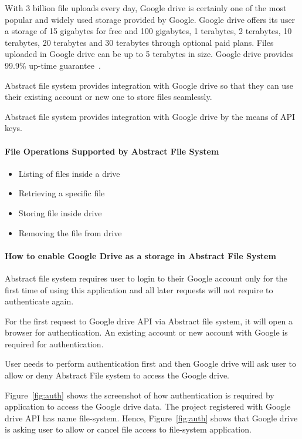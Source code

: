 With 3 billion file uploads every day, Google drive is certainly one of the 
most popular and widely used storage provided by Google. Google drive offers 
its user a storage of 15 gigabytes for free and 100 gigabytes, 1 terabytes, 2 
terabytes, 10 terabytes, 20 terabytes and 30 terabytes through optional paid 
plans. Files uploaded in Google drive can be up to 5 terabytes in size. Google 
drive provides 99.9\% up-time guarantee~\cite{hid-sp18-420-google-drive-wiki}. 

Abstract file system provides integration with Google drive so that they can 
use their existing account or new one to store files seamlessly.

Abstract file system provides integration with Google drive by the means of 
API keys. 

\paragraph{File Operations Supported by Abstract File System }

\begin{itemize}
    \item  Listing of files inside a drive
    \item  Retrieving a specific file 
    \item  Storing file inside drive
    \item  Removing the file from drive
\end{itemize}

\paragraph{How to enable Google Drive as a storage in Abstract File System}

Abstract file system requires user to login to their Google account only for 
the first time of using this application and all later requests will not 
require to authenticate again. 

For the first request to Google drive API via Abstract file system, it will 
open a browser for authentication. An existing account or new account with 
Google is required for authentication. 

User needs to perform authentication first and then Google drive will ask user 
to allow or deny Abstract File system to access the Google drive. 

Figure~\ref{fig:auth} shows the screenshot of how authentication is 
required by application to access the Google drive data. 
The project registered with Google drive API has name file-system. 
Hence, Figure~\ref{fig:auth} shows that Google drive is asking user 
to allow or cancel file access to file-system application. 

